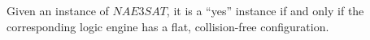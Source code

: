 % 
% 
\begin{thm}\label{thm:Satisfiability-1}
 Given an instance of $NAE3SAT$,  it is a ``yes'' instance if and only if the 
corresponding logic engine has a flat, collision-free configuration.
\end{thm}
